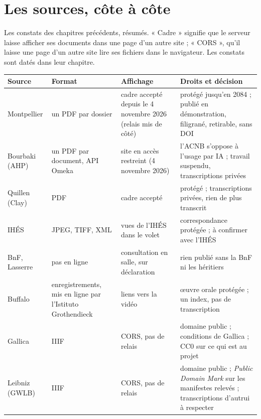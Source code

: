 \chapter{Les sources, côte à côte}\label{ch:tableau}

Les constats des chapitres précédents, résumés. « Cadre » signifie que le serveur laisse
afficher ses documents dans une page d'un autre site ; « CORS », qu'il laisse une page d'un
autre site lire ses fichiers dans le navigateur. Les constats sont datés dans leur
chapitre.

\begin{center}
\small\sffamily
\renewcommand{\arraystretch}{1.25}
\begin{tabular}{@{}p{2.3cm}p{2.0cm}p{2.5cm}p{3.6cm}@{}}
\textbf{Source} & \textbf{Format} & \textbf{Affichage} & \textbf{Droits et décision} \\ \hline
Montpellier & un PDF par dossier & cadre accepté depuis le 4 novembre 2026 (relais mis de côté) &
  protégé jusqu'en 2084 ; publié en démonstration, filigrané, retirable, sans DOI \\
Bourbaki (AHP) & un PDF par document, API Omeka & site en accès restreint (4 novembre 2026) &
  l'ACNB s'oppose à l'usage par IA ; travail suspendu, transcriptions privées \\
Quillen (Clay) & PDF & cadre accepté & protégé ; transcriptions privées, rien de plus
  transcrit \\
IHÉS & JPEG, TIFF, XML & vues de l'IHÉS dans le volet & correspondance protégée ; à
  confirmer avec l'IHÉS \\
BnF, Lasserre & pas en ligne & consultation en salle, sur déclaration & rien publié sans la BnF
  ni les héritiers \\
Buffalo & enregistrements, mis en ligne par l'Istituto Grothendieck & liens vers la vidéo &
  œuvre orale protégée ; un index, pas de transcription \\
Gallica & IIIF & CORS, pas de relais & domaine public ; conditions de Gallica ; CC0 sur ce
  qui est au projet \\
Leibniz (GWLB) & IIIF & CORS, pas de relais & domaine public ; \emph{Public Domain Mark}
  sur les manifestes relevés ; transcriptions d'autrui à respecter \\
\end{tabular}
\end{center}
